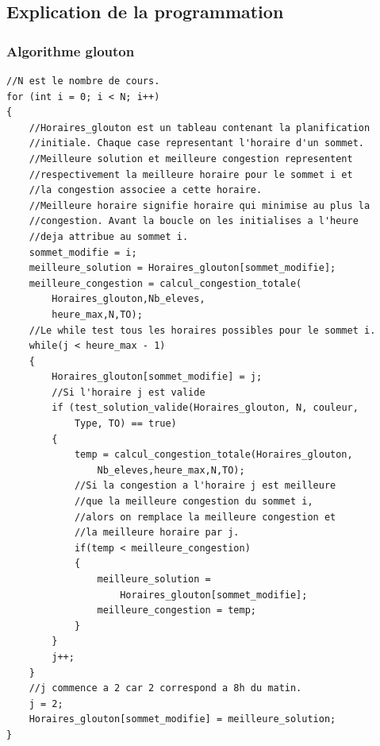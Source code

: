 \documentclass[a4paper,11pt]{article}
\begin{document}
	\subsection{Explication de la programmation}
		\subsubsection{Algorithme glouton}
\begin{lstlisting}
//N est le nombre de cours.
for (int i = 0; i < N; i++)
{
	//Horaires_glouton est un tableau contenant la planification 
	//initiale. Chaque case representant l'horaire d'un sommet.
	//Meilleure solution et meilleure congestion representent 
	//respectivement la meilleure horaire pour le sommet i et 
	//la congestion associee a cette horaire.
	//Meilleure horaire signifie horaire qui minimise au plus la 
	//congestion. Avant la boucle on les initialises a l'heure 
	//deja attribue au sommet i.
	sommet_modifie = i;
	meilleure_solution = Horaires_glouton[sommet_modifie];
	meilleure_congestion = calcul_congestion_totale(
		Horaires_glouton,Nb_eleves,
		heure_max,N,TO);
	//Le while test tous les horaires possibles pour le sommet i.
	while(j < heure_max - 1)
	{
		Horaires_glouton[sommet_modifie] = j;
		//Si l'horaire j est valide
		if (test_solution_valide(Horaires_glouton, N, couleur, 
			Type, TO) == true)
		{
			temp = calcul_congestion_totale(Horaires_glouton,
				Nb_eleves,heure_max,N,TO);
			//Si la congestion a l'horaire j est meilleure 
			//que la meilleure congestion du sommet i, 
			//alors on remplace la meilleure congestion et
			//la meilleure horaire par j.
			if(temp < meilleure_congestion)
			{
				meilleure_solution = 
					Horaires_glouton[sommet_modifie];
				meilleure_congestion = temp;
			}
		}
		j++;
	}
	//j commence a 2 car 2 correspond a 8h du matin.
	j = 2;
	Horaires_glouton[sommet_modifie] = meilleure_solution;
}
\end{lstlisting}
\end{document}
